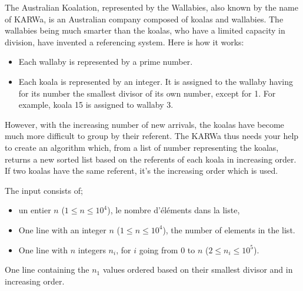 \problemname{\problemyamlname}

The Australian Koalation, represented by the Wallabies, also known by the name of KARWa, is an Australian company composed of koalas and wallabies.
The wallabies being much smarter than the koalas, who have a limited capacity in division, have invented a referencing system.
Here is how it works:

\begin{itemize}
	\item Each wallaby is represented by a prime number.
	\item Each koala is represented by an integer. It is assigned to the wallaby having for its number the smallest divisor of its own number, except for 1. For example, koala 15 is assigned to wallaby 3.
\end{itemize}

However, with the increasing number of new arrivals, the koalas have become much more difficult to group by their referent.
The KARWa thus needs your help to create an algorithm which, from a list of number representing the koalas, returns a new sorted list based on the referents of each koala in increasing order.
If two koalas have the same referent, it's the increasing order which is used.

\begin{Input}
	The input consists of;
	\begin{itemize}
		\item un entier $n$ ($1 \leq n \leq 10^4$), le nombre d'éléments dans la liste,
		\item One line with an integer $n$ ($1 \leq n \leq 10^4$), the number of elements in the list.
		\item One line with $n$ integers $n_i$, for $i$ going from $0$ to $n$ ($2 \leq n_i \leq 10^5$).
	\end{itemize}
\end{Input}

\begin{Output}
	One line containing the $n_1$ values ordered based on their smallest divisor and in increasing order.
\end{Output}
